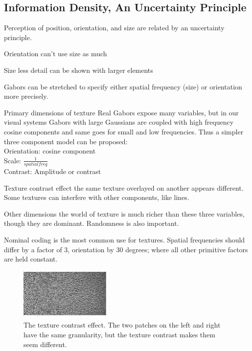 \begin{mdframed}\begin{multicols}{2}
\subsection{Information Density, An Uncertainty Principle}
\begin{compactdesc}
    \item[Perception of position, orientation, and size] are related
        by an uncertainty principle.
    \item[Orientation] can't use size as much
    \item[Size] less detail can be shown with larger elements
    \item[Gabors] can be stretched to specify either spatial frequency (size)
        or orientation more precisely.
    \item[Primary dimensions of texture]
        Real Gabors expose many variables, but in our visual systems Gabors
        with large Gaussians are coupled with high frequency cosine components
        and same goes for small and low frequencies. Thus a simpler three
        component model can be proposed:
        \\
        Orientation: cosine component
        \\
        Scale: $\frac{1}{spatial freq}$
        \\
        Contrast: Amplitude or contrast
    \item[Texture contrast effect] the same texture overlayed on another
        appears different. Some textures can interfere with other components,
        like lines.
    \item[Other dimensions] the world of texture is much richer than these
        three variables, though they are dominant. Randomness is also
        important.
    \item[Nominal coding] is the most common use for textures.
        Spatial frequencies should differ by a factor of 3, orientation
        by 30 degrees; where all other primitive factors are held constant.
\end{compactdesc}
    \begin{figure}[H]
        \centering
        \includegraphics[width=0.4\textwidth]{texture_contrast.png}
        \caption{The texture contrast effect. The two patches on the left and
            right have the same granularity, but the texture contrast makes
            them seem different.}
    \end{figure}
\end{multicols}\end{mdframed}



